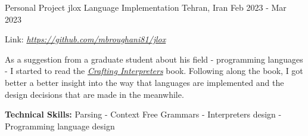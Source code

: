 

\begin{cventries}


  \cventry
  {Personal Project} %
  {jlox Language Implementation} %
  {Tehran, Iran} %
  {Feb 2023 - Mar 2023} %
  {
    \begin{cvitems} %
    \item {Link: \href{https://github.com/mbroughani81/jlox}{\textit{https://github.com/mbroughani81/jlox}}}
    \item {As a suggestion from a graduate student about his field - programming languages - I started to read the \href{https://craftinginterpreters.com/}{\textit{Crafting Interpreters}} book. Following along the book, I got better a better insight into the way that languages are implemented and the design decisions that are made in the meanwhile.}
    \item {\textbf{Technical Skills:} Parsing - Context Free Grammars - Interpreters design - Programming language design}
    \end{cvitems}
  }


\end{cventries}
